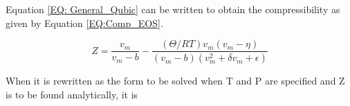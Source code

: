 \documentclass[../Article_Model_Parameters.tex]{subfiles}
\begin{document}
	\begin{table}[h!]
		\centering
		\caption{Parameters for Popular Cubic EoS}
		\label{tab:Popular_Cubic_EoS_alpha}
	\end{table}
	
	Equation \ref{EQ: General_Qubic} can be written to obtain the compressibility as given by Equation \ref{EQ:Comp_EOS}.
	
	{\footnotesize
	\begin{equation} \label{EQ:Comp_EOS}
		Z = \frac{v_m}{v_m-b} - \frac{\left( \Theta /RT \right) v_m \left( v_m - \eta \right) }{\left( v_m - b \right) \left(v_m^2 + \delta v_m + \epsilon \right)}
	\end{equation}
	}
	
	When it is rewritten as the form to be solved when T and P are specified and Z is to be found analytically, it is
	
\end{document}
